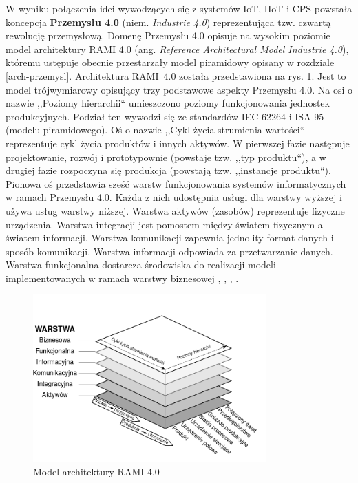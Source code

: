 \documentclass[a4paper, 12pt, twoside]{article}
\begin{document}
W wyniku połączenia idei wywodzących się z systemów IoT, IIoT i CPS
powstała koncepcja \textbf{Przemysłu 4.0} (niem. \emph{Industrie 4.0}) reprezentująca
tzw. czwartą rewolucję przemysłową. Domenę Przemysłu 4.0 opisuje na wysokim poziomie
model architektury RAMI 4.0 (ang. \emph {Reference Architectural
      Model Industrie 4.0}), któremu ustępuje
obecnie przestarzały model piramidowy opisany w rozdziale \ref{arch-przemysl}.
Architektura RAMI~4.0 została przedstawiona na rys. \ref{fig:rami}.
Jest to model trójwymiarowy opisujący trzy podstawowe aspekty Przemysłu 4.0.
Na osi o nazwie ,,Poziomy hierarchii`` umieszczono poziomy funkcjonowania
jednostek produkcyjnych. Podział ten wywodzi się ze standardów IEC 62264 i
ISA-95 (modelu piramidowego). Oś o nazwie ,,Cykl życia strumienia wartości``
reprezentuje cykl życia produktów i innych aktywów. W pierwszej fazie
następuje projektowanie, rozwój i prototypownie (powstaje tzw. ,,typ produktu``), a w
drugiej fazie rozpoczyna się produkcja (powstają tzw. ,,instancje produktu``).
Pionowa oś przedstawia sześć warstw funkcjonowania systemów informatycznych
w ramach Przemysłu 4.0. Każda z nich udostępnia usługi dla warstwy wyższej
i używa usług warstwy niższej. Warstwa aktywów (zasobów) reprezentuje fizyczne
urządzenia. Warstwa integracji jest pomostem między światem fizycznym a światem
informacji. Warstwa komunikacji zapewnia jednolity format danych i sposób komunikacji.
Warstwa informacji odpowiada za przetwarzanie danych. Warstwa funkcjonalna
dostarcza środowiska do realizacji modeli implementowanych w ramach warstwy biznesowej
\cite{iiot-challenges-opportunities-directions},
\cite{industry4-ref-models}, \cite{rami4}, \cite{iiot-cyber-manufacturing-systems}.

\begin{figure}[h]
      \centering
      \includegraphics[width=0.8\textwidth]{RAMI4.png}
      \caption{Model architektury RAMI 4.0}
      \label{fig:rami}
\end{figure}
\end{document}
